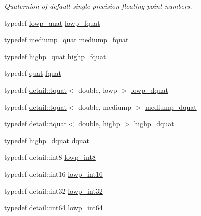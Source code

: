 \begin{DoxyCompactItemize}
\begin{DoxyCompactList}\small\item\em Quaternion of default single-\/precision floating-\/point numbers. \end{DoxyCompactList}\item 
typedef \hyperlink{namespaceglm_aefc1d896fa40939955d68b2c68c33cc8}{lowp\+\_\+quat} \hyperlink{namespaceglm_aad1f5b3c348c223fb36e28f646552cff}{lowp\+\_\+fquat}
\item 
typedef \hyperlink{namespaceglm_aa891775f83d9da605b5dd0dc34a3ef62}{mediump\+\_\+quat} \hyperlink{namespaceglm_a154ae157e20a677e5663d97b923b1053}{mediump\+\_\+fquat}
\item 
typedef \hyperlink{namespaceglm_a8d2836172e6561f6519c39d0b5d025c1}{highp\+\_\+quat} \hyperlink{namespaceglm_ad1acf6af4ae4af94dfec8814b058d5eb}{highp\+\_\+fquat}
\item 
typedef \hyperlink{namespaceglm_ac1f6a5957091b849730ea6f05a6b7ad6}{quat} \hyperlink{group__gtc__type__precision_gaa95d73f08018f3864c6ae08dbf1c59f2}{fquat}
\item 
typedef \hyperlink{structglm_1_1detail_1_1tquat}{detail\+::tquat}$<$ double, lowp $>$ \hyperlink{namespaceglm_ad5f207f07b36f4ebd98338c21b92062e}{lowp\+\_\+dquat}
\item 
typedef \hyperlink{structglm_1_1detail_1_1tquat}{detail\+::tquat}$<$ double, mediump $>$ \hyperlink{namespaceglm_a302e27293c89ef6128f4eb14ea06ec8b}{mediump\+\_\+dquat}
\item 
typedef \hyperlink{structglm_1_1detail_1_1tquat}{detail\+::tquat}$<$ double, highp $>$ \hyperlink{namespaceglm_a6504747f6a2ec4a369a51244fcabc61e}{highp\+\_\+dquat}
\item 
typedef \hyperlink{namespaceglm_a6504747f6a2ec4a369a51244fcabc61e}{highp\+\_\+dquat} \hyperlink{namespaceglm_a49693161673a003b4a8fd4d8b15b0b7b}{dquat}
\item 
typedef detail\+::int8 \hyperlink{group__gtc__type__precision_gaf9e675b6392764242ae87eb179e9d3d6}{lowp\+\_\+int8}
\item 
typedef detail\+::int16 \hyperlink{group__gtc__type__precision_ga71fc0c399fa4780507748b643733f153}{lowp\+\_\+int16}
\item 
typedef detail\+::int32 \hyperlink{group__gtc__type__precision_gad9939c9d6fec1c6accc02a83c6500f08}{lowp\+\_\+int32}
\item 
typedef detail\+::int64 \hyperlink{group__gtc__type__precision_gab8a8e75af347592406e41b3ae2c0712b}{lowp\+\_\+int64}
\item 

\end{DoxyCompactItemize}
